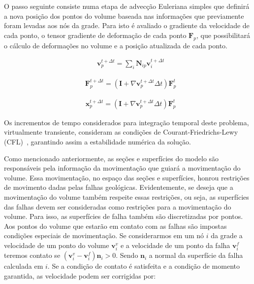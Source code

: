 O passo seguinte consiste numa etapa de advecção Euleriana simples que definirá a nova posição dos pontos do volume baseada nas informações que previamente foram levadas aos nós da grade. Para isto é avaliado o gradiente da velocidade de cada ponto, o tensor gradiente de deformação de cada ponto $\boldsymbol{F}_p$, que possibilitará o cálculo de deformações no volume e a posição atualizada de cada ponto.

\begin{align}
  &\boldsymbol{v}_p^{t+\Delta t} = \textstyle\sum_i\boldsymbol{N}_{ip}\boldsymbol{v}_i^{t+\Delta t}
\end{align}

\begin{align}
  &\boldsymbol{F}_p^{t+\Delta t} = (\boldsymbol{I} + \nabla\boldsymbol{v}_p^{t+\Delta t}\Delta t) \boldsymbol{F}_p^t
\end{align}

\begin{align}
  &\boldsymbol{x}_p^{t+\Delta t} = (\boldsymbol{I} + \nabla\boldsymbol{v}_p^{t+\Delta t}\Delta t) \boldsymbol{F}_p^t
\end{align}

Os incrementos de tempo considerados para integração temporal deste problema, virtualmente transiente, consideram as condições de Courant-Friedrichs-Lewy (CFL)~\cite{CFL}, garantindo assim a estabilidade numérica da solução.

Como mencionado anteriormente, as seções e superfícies do modelo são responsáveis pela informação da movimentação que guiará a movimentação do volume. Essa movimentação, no espaço das seções e superfícies, honrou restrições de movimento dadas pelas falhas geológicas. Evidentemente, se deseja que a movimentação do volume também respeite essas restrições, ou seja, as superfícies das falhas devem ser consideradas como restrições para a movimentação do volume. Para isso, as superfícies de falha também são discretizadas por pontos. Aos pontos do volume que estarão em contato com as falhas são impostas condições especiais de movimentação. Se considerarmos em um nó $i$ da grade a velocidade de um ponto do volume $\boldsymbol{v}_i^v$ e a velocidade de um ponto da falha $\boldsymbol{v}_i^f$ teremos contato se $\left(\boldsymbol{v}_i^v-\boldsymbol{v}_i^f\right)\boldsymbol{n}_i>0$. Sendo $\boldsymbol{n}_i$ a normal da superfície da falha calculada em $i$. Se a condição de contato é satisfeita e a condição de momento garantida, as velocidade podem ser corrigidas por:

